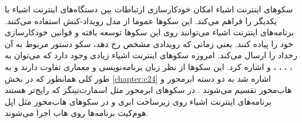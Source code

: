 سکوهای اینترنت اشیاء امکان خودکارسازی ارتباطات بین دستگاه‌های اینترنت اشیاء با یکدیگر را فراهم می‌کند. این سکوها عموما از مدل رویداد-کنش استفاده می‌کنند. برنامه‌های اینترنت اشیاء می‌توانند روی این سکوها توسعه یافته و قوانین خودکارسازی خود را پیاده کنند. یعنی زمانی که رویدادی مشخص رخ دهد، سکو دستور مربوط به آن رخداد را ارسال می‌کند.
امروزه سکوهای اینترنت اشیاء زیادی وجود دارد که می‌توان به  \cite{x261}،  \cite{x262}،  \cite{x263}،  \cite{x264}،  \cite{x265} و  \cite{x266} اشاره کرد. این سکوها از نظر زبان برنامه‌نویسی و معماری تفاوت دارند و به طور کلی همانطور که در بخش \ref{chapter:c24} اشاره شد به دو دسته ابرمحور و هاب‌محور تقسیم می‌شوند \cite{x267}. در سکوهای ابر‌محور مثل اسمارت‌تینگز که رایج‌تر هستند برنامه‌های اینترنت اشیاء روی زیرساخت ابری و در سکوهای هاب‌محور مثل اپل هوم‌کیت برنامه‌ها روی هاب اجرا می‌شوند. 
